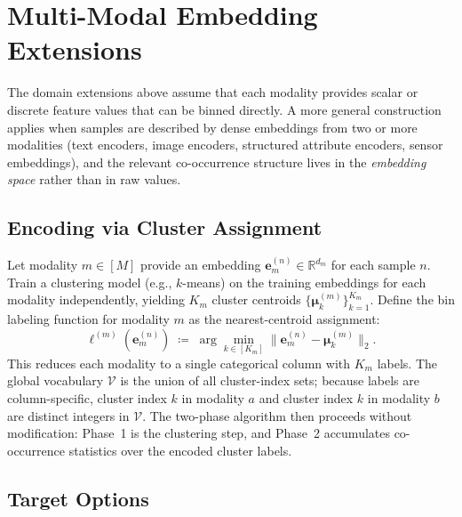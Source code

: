 \documentclass[11pt]{article}
\begin{document}
\section{Multi-Modal Embedding Extensions}
\label{app:multimodal}

The domain extensions above assume that each modality provides scalar or discrete feature values that can be binned directly.
A more general construction applies when samples are described by dense embeddings from two or more modalities (text encoders, image encoders, structured attribute encoders, sensor embeddings), and the relevant co-occurrence structure lives in the \emph{embedding space} rather than in raw values.

\subsection{Encoding via Cluster Assignment}

Let modality $m \in [M]$ provide an embedding $\bm{e}_m^{(n)} \in \mathbb{R}^{d_m}$ for each sample $n$.
Train a clustering model (e.g., $k$-means) on the training embeddings for each modality independently, yielding $K_m$ cluster centroids $\{\bm{\mu}_k^{(m)}\}_{k=1}^{K_m}$.
Define the bin labeling function for modality $m$ as the nearest-centroid assignment:
\[
  \ell^{(m)}(\bm{e}_m^{(n)}) \;\coloneqq\; \arg\min_{k \in [K_m]} \bigl\lVert \bm{e}_m^{(n)} - \bm{\mu}_k^{(m)} \bigr\rVert_2.
\]
This reduces each modality to a single categorical column with $K_m$ labels.
The global vocabulary $\mathcal{V}$ is the union of all cluster-index sets; because labels are column-specific, cluster index $k$ in modality $a$ and cluster index $k$ in modality $b$ are distinct integers in $\mathcal{V}$.
The two-phase algorithm then proceeds without modification: Phase~1 is the clustering step, and Phase~2 accumulates co-occurrence statistics over the encoded cluster labels.

\subsection{Target Options}
\end{document}
